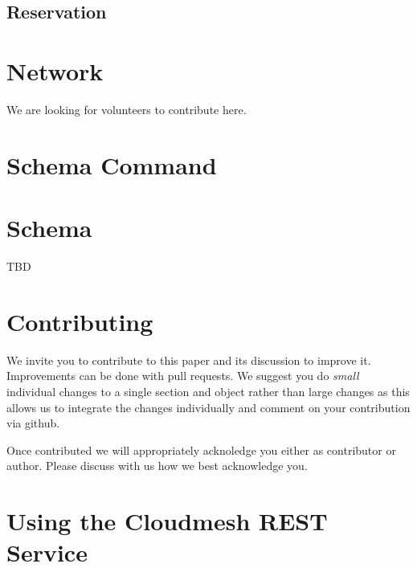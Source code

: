 \documentclass[9pt,twocolumn]{styles/osajnl}
\begin{document}
\subsection{Reservation}


\section{Network}

We are looking for volunteers to contribute here.

\newpage

\appendix

\section{Schema Command}




\section{Schema}\label{a:schema}

TBD


\section{Contributing}

We invite you to contribute to this paper and its discussion to
improve it. Improvements can be done with pull requests. We suggest
you do {\em small} individual changes to a single section and object
rather than large changes as this allows us to integrate the changes
individually and comment on your contribution via github.

Once contributed we will appropriately acknoledge you either as
contributor or author. Please discuss with us how we best acknowledge
you.

\section{Using the Cloudmesh REST Service} 
\end{document}
